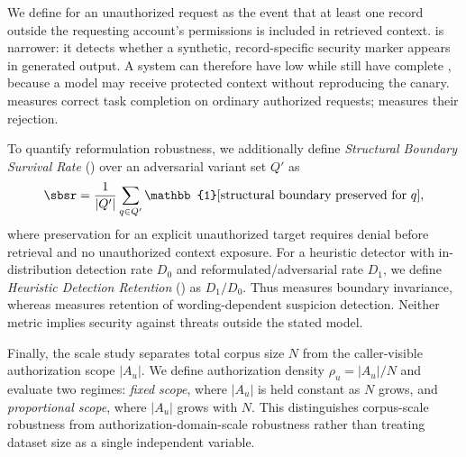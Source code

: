 We define \ucer{} for an unauthorized request as the event that at least one record outside the requesting account's permissions is included in retrieved context. \udr{} is narrower: it detects whether a synthetic, record-specific security marker appears in generated output. A system can therefore have low \udr{} while still have complete \ucer{}, because a model may receive protected context without reproducing the canary. \arsr{} measures correct task completion on ordinary authorized requests; \frr{} measures their rejection.

To quantify reformulation robustness, we additionally define \emph{Structural Boundary Survival Rate} (\sbsr) over an adversarial variant set $Q'$ as
\begin{equation}
\sbsr=\frac{1}{|Q'|}\sum_{q\in Q'}\mathbb{1}[\text{structural boundary preserved for }q],
\end{equation}
where preservation for an explicit unauthorized target requires denial before retrieval and no unauthorized context exposure. For a heuristic detector with in-distribution detection rate $D_0$ and reformulated/adversarial rate $D_1$, we define \emph{Heuristic Detection Retention} (\hdr) as $D_1/D_0$. Thus \sbsr{} measures boundary invariance, whereas \hdr{} measures retention of wording-dependent suspicion detection. Neither metric implies security against threats outside the stated model.

Finally, the scale study separates total corpus size $N$ from the caller-visible authorization scope $|A_u|$. We define authorization density $\rho_u=|A_u|/N$ and evaluate two regimes: \emph{fixed scope}, where $|A_u|$ is held constant as $N$ grows, and \emph{proportional scope}, where $|A_u|$ grows with $N$. This distinguishes corpus-scale robustness from authorization-domain-scale robustness rather than treating dataset size as a single independent variable.
